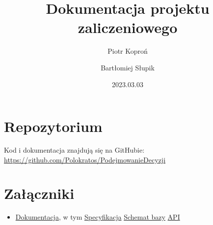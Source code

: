 \documentclass[12pt, a4paper]{article}
\author{Piotr Koproń \and Bartłomiej Słupik}
\date{2023.03.03}
\title{Dokumentacja projektu zaliczeniowego}
\begin{document}
    \section*{Repozytorium}
    Kod i dokumentacja znajdują się na GitHubie: \\ \href{https://github.com/Polokratos/PodejmowanieDecyzji}{https://github.com/Polokratos/PodejmowanieDecyzji}

    \section*{Załączniki}
    \begin{itemize}
        \item \href{https://github.com/Polokratos/PodejmowanieDecyzji/tree/main/docs}{Dokumentacja}, w tym
        \subitem \href{https://github.com/Polokratos/PodejmowanieDecyzji/blob/main/docs/lab1.pdf}{Specyfikacja}
        \subitem \href{https://github.com/Polokratos/PodejmowanieDecyzji/blob/main/docs/db-diagram-vert.PNG}{Schemat bazy}
        \subitem \href{https://github.com/Polokratos/PodejmowanieDecyzji/blob/main/docs/api.json}{API}
    \end{itemize}
\end{document}

